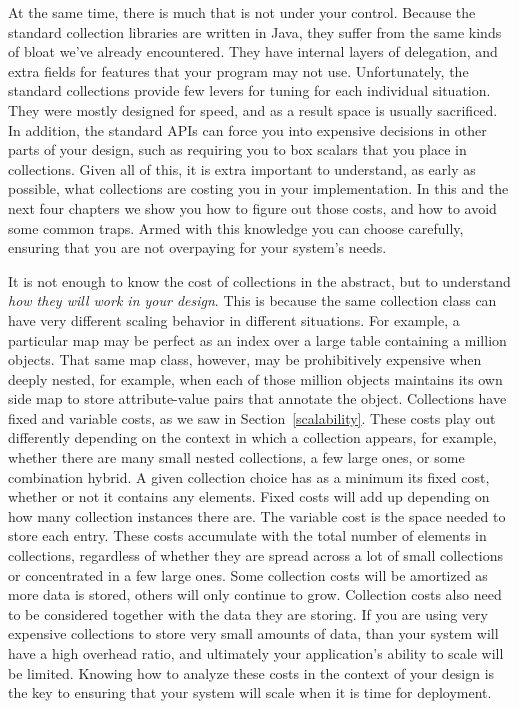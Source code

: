 At the same time, there is much that is not under your control.
Because the standard collection libraries are written in Java, they suffer from
the same kinds of bloat we've already encountered. They have internal layers
of delegation, and extra fields for features that your program may not
use. Unfortunately, the standard collections provide few levers for
tuning for each individual situation. They were
mostly designed for speed, and as a result space is usually sacrificed. In
addition, the standard APIs can force you into expensive decisions in other
parts of your design, such as requiring you to box scalars that you place in
collections. Given all of this, it is extra important to understand, as early as possible,
what collections are costing you in your implementation. In this and
the next four chapters we show you how to figure out those costs, and how
to avoid some common traps. Armed with this
knowledge you can choose carefully, ensuring that you are not
overpaying for your system's needs.

It is not enough to know the cost
of collections in the abstract, but to understand \emph{how they will work in
your design}. This is because the same collection class can have very different
scaling behavior in different situations. For example, a particular map
may be perfect as an index over a large table containing a
million objects. That same map class, however, may be prohibitively expensive
when deeply nested, for example, when each of those
million objects maintains its own side map to store attribute-value pairs that
annotate the object.
Collections have fixed and variable costs, as we saw
in Section~\ref{scalability}. These costs play out differently
depending on the context in which a collection appears, for example, whether
there are many small nested collections, a few large ones, or some combination
hybrid.  A given collection choice has as a minimum its fixed cost,
whether or not it contains any elements. Fixed costs will add up depending on
how many collection instances there are. The variable cost is the space needed to store each entry. These
 costs accumulate with the total number of
elements in collections, regardless of whether they are spread across a lot of
small collections or concentrated in a few large ones. 
Some collection costs will be amortized as more data is stored, others will only
continue to grow. Collection costs also need to be considered together with the data they are
storing. If you are using very expensive collections to store very small amounts
of data, than your system will have a high overhead ratio, and ultimately your application's ability
to scale will be limited. 
Knowing how to analyze these costs in the context of your design
is the key to ensuring that your system will scale when it is time for
deployment.  


